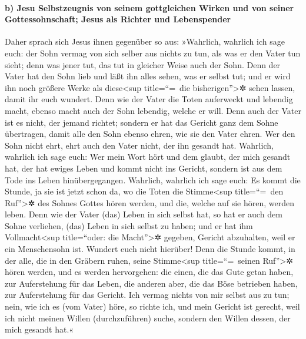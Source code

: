 \hypertarget{b-jesu-selbstzeugnis-von-seinem-gottgleichen-wirken-und-von-seiner-gottessohnschaft-jesus-als-richter-und-lebenspender}{%
\paragraph{b) Jesu Selbstzeugnis von seinem gottgleichen Wirken und von
seiner Gottessohnschaft; Jesus als Richter und
Lebenspender}\label{b-jesu-selbstzeugnis-von-seinem-gottgleichen-wirken-und-von-seiner-gottessohnschaft-jesus-als-richter-und-lebenspender}}

 Daher sprach sich Jesus ihnen gegenüber so aus:
»Wahrlich, wahrlich ich sage euch: der Sohn vermag von sich selber aus
nichts zu tun, als was er den Vater tun sieht; denn was jener tut, das
tut in gleicher Weise auch der Sohn.  Denn der Vater hat
den Sohn lieb und läßt ihn alles sehen, was er selbst tut; und er wird
ihn noch größere Werke als diese\textless sup title=``=~die
bisherigen''\textgreater✲ sehen lassen, damit ihr euch wundert.
 Denn wie der Vater die Toten auferweckt und lebendig
macht, ebenso macht auch der Sohn lebendig, welche er will.
 Denn auch der Vater ist es nicht, der jemand richtet;
sondern er hat das Gericht ganz dem Sohne übertragen, 
damit alle den Sohn ebenso ehren, wie sie den Vater ehren. Wer den Sohn
nicht ehrt, ehrt auch den Vater nicht, der ihn gesandt hat.
 Wahrlich, wahrlich ich sage euch: Wer mein Wort hört und
dem glaubt, der mich gesandt hat, der hat ewiges Leben und kommt nicht
ins Gericht, sondern ist aus dem Tode ins Leben hinübergegangen.
 Wahrlich, wahrlich ich sage euch: Es kommt die Stunde,
ja sie ist jetzt schon da, wo die Toten die Stimme\textless sup
title=``=~den Ruf''\textgreater✲ des Sohnes Gottes hören werden, und
die, welche auf sie hören, werden leben.  Denn wie der
Vater (das) Leben in sich selbst hat, so hat er auch dem Sohne
verliehen, (das) Leben in sich selbst zu haben;  und er
hat ihm Vollmacht\textless sup title=``oder: die Macht''\textgreater✲
gegeben, Gericht abzuhalten, weil er ein Menschensohn ist.
 Wundert euch nicht hierüber! Denn die Stunde kommt, in
der alle, die in den Gräbern ruhen, seine Stimme\textless sup
title=``=~seinen Ruf''\textgreater✲ hören werden,  und es
werden hervorgehen: die einen, die das Gute getan haben, zur
Auferstehung für das Leben, die anderen aber, die das Böse betrieben
haben, zur Auferstehung für das Gericht.  Ich vermag
nichts von mir selbst aus zu tun; nein, wie ich es (vom Vater) höre, so
richte ich, und mein Gericht ist gerecht, weil ich nicht meinen Willen
(durchzuführen) suche, sondern den Willen dessen, der mich gesandt hat.«

